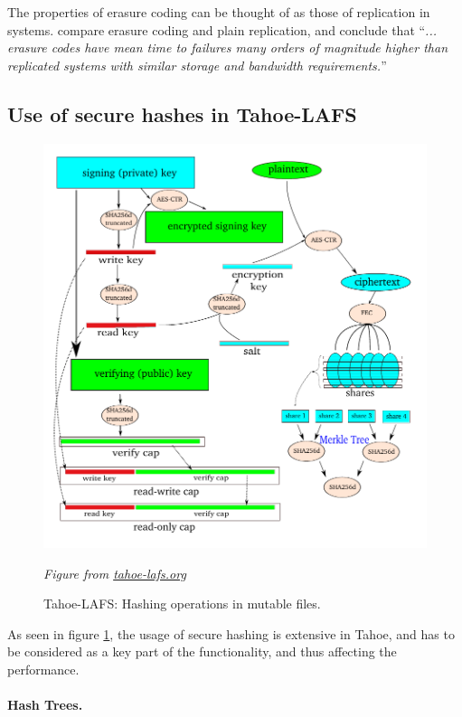 \documentclass[english,12pt,a4paper]{book}
\begin{document}
The properties of erasure coding can be thought of as those of replication in
 systems. \citet*{t_erasure} compare erasure coding and plain
replication, and conclude that ``\emph{...  erasure codes have mean time to
failures many orders of magnitude higher than replicated systems with similar
storage and bandwidth requirements.}''

\subsection{Use of secure hashes in Tahoe-LAFS}

\begin{figure}[!h]
    \centering
    \includegraphics[width=0.9\columnwidth]{Tahoe-hashing.pdf}
    \caption{Tahoe-LAFS: Hashing operations in mutable files.}
    \label{fig:tahoehashing}
    \emph{Figure from
     \href{http://tahoe-lafs.org/source/tahoe/trunk/docs/specifications/mut.svg}
     {tahoe-lafs.org}}
\end{figure}

As seen in figure \ref{fig:tahoehashing}, the usage of secure hashing is
extensive in Tahoe, and has to be considered as a key part of the functionality,
and thus affecting the performance.

\paragraph{Hash Trees.}
\end{document}

